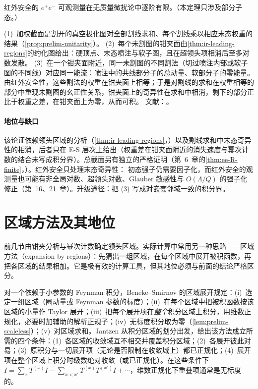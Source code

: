 \begin{theorem}\label{thm:ir-safe-finite}
红外安全的 $e^+e^-$ 可观测量在无质量微扰论中逐阶有限。（本定理只涉及部分子态。）
\end{theorem}
\begin{proofsketch}
(1)~加权截面是割开的真空极化图对全部割线求和、每个割线乘以相应末态权重的结果（\cref{prop:prelim-unitarity}）。
(2)~每个未割图的钳夹面由\cref{thm:ir-leading-regions}的约化图给出：硬顶点、末态喷注与软子图，且在超领头项相消后至多对数发散。
(3)~在一个钳夹面附近，同一未割图的不同割法（切过喷注内部或软子图的不同线）对应同一能流：喷注中的共线部分子的总动量、软部分子的零能量。由红外安全性，这些割法的权重在钳夹面上相等；于是对割线的求和在权重相等的部分中重现未割图的幺正性关系，钳夹面上的奇异性在求和中相消，剩下的部分正比于权重之差，在钳夹面上为零，从而可积。
文献：\cite{Sterman1978a,Sterman1978b,Sterman:1979uw,StermanWeinberg1977,Ore:1979ry}。
\end{proofsketch}

\paragraph{地位与缺口}
该论证依赖领头区域的分析（\cref{thm:ir-leading-regions}，\tagA）以及割线求和中末态奇异性的相消，后者只在 E-S 层次上给出（权重差在钳夹面附近的消失速度与幂次计数的结合未写成积分界）\cite{Sterman1978a,Sterman1978b}。总截面另有独立的严格证明（第~6~章的\cref{thm:ee-R-finite}，\tagR）。红外安全只处理末态奇异性：%
初态强子仍需要因子化，而红外安全的观测量也可能有非全局对数、超领头对数、Glauber 敏感性与 $O(\Lambda/Q)$ 的强子化修正（第~16、21~章）。升级途径：把 (3) 写成对嵌套邻域一致的积分界。
\section{区域方法及其地位}\label{sec:ir-regions}

前几节由钳夹分析与幂次计数确定领头区域。实际计算中常用另一种思路——区域方法（expansion by regions）：先猜出一组区域，在每个区域中展开被积函数，再把各区域的结果相加。它是极有效的计算工具，但其地位必须与前面的结论严格区分。

\begin{definition}[区域方法]\label{def:ir-regions}
对一个依赖于小参数的 Feynman 积分，Beneke--Smirnov 的区域展开\cite{BenekeSmirnov1998}规定：(i)~选定一组区域（圈动量或 Feynman 参数的标度）；(ii)~在每个区域中把被积函数按该区域的小量作 Taylor 展开；(iii)~把每个展开项在\emph{整个}积分区域上积分，用维数正规化，必要时加辅助的解析正规子；(iv)~无标度积分取为零（\cref{lem:prelim-scaleless}）；(v)~对区域求和。Jantzen 从积分区域的划分出发，给出该方法成立所需的四个条件\cite[第~3~节]{Jantzen2011}：(1)~各区域的收敛域互不相交并覆盖积分区域；(2)~各展开彼此对易；(3)~原积分与一切展开项（无论是否限制在收敛域上）都已正规化；(4)~展开项在整个区域上积分时级数绝对收敛（或已正规化）。在这些条件下 $I=\sum_xT^{(x)}I-\sum_{x<x'}T^{(x)}T^{(x')}I+\cdots$，维数正规化下重叠项通常是无标度的。
\end{definition}

